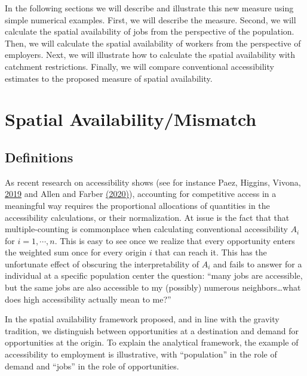 \documentclass[]{elsarticle} %
\begin{document}
In the following sections we will describe and illustrate this new
measure using simple numerical examples. First, we will describe the
measure. Second, we will calculate the spatial availability of jobs from
the perspective of the population. Then, we will calculate the spatial
availability of workers from the perspective of employers. Next, we will
illustrate how to calculate the spatial availability with catchment
restrictions. Finally, we will compare conventional accessibility
estimates to the proposed measure of spatial availability.

\hypertarget{spatial-availabilitymismatch}{%
\section{Spatial
Availability/Mismatch}\label{spatial-availabilitymismatch}}

\hypertarget{definitions}{%
\subsection{Definitions}\label{definitions}}

As recent research on accessibility shows (see for instance Paez,
Higgins, Vivona,
\href{https://doi.org/10.1371/journal.pone.0218773}{2019} and Allen and
Farber \href{https://doi.org/10.1111/gean.12188}{(2020)}), accounting
for competitive access in a meaningful way requires the proportional
allocations of quantities in the accessibility calculations, or their
normalization. At issue is the fact that that multiple-counting is
commonplace when calculating conventional accessibility \(A_i\) for
\(i=1,\cdots,n\). This is easy to see once we realize that every
opportunity enters the weighted sum once for every origin \(i\) that can
reach it. This has the unfortunate effect of obscuring the
interpretability of \(A_i\) and fails to answer for a individual at a
specific population center the question: ``many jobs are accessible, but
the same jobs are also accessible to my (possibly) numerous
neighbors\ldots what does high accessibility actually mean to me?''

In the spatial availability framework proposed, and in line with the
gravity tradition, we distinguish between opportunities at a destination
and demand for opportunities at the origin. To explain the analytical
framework, the example of accessibility to employment is illustrative,
with ``population'' in the role of demand and ``jobs'' in the role of
opportunities.
\end{document}
